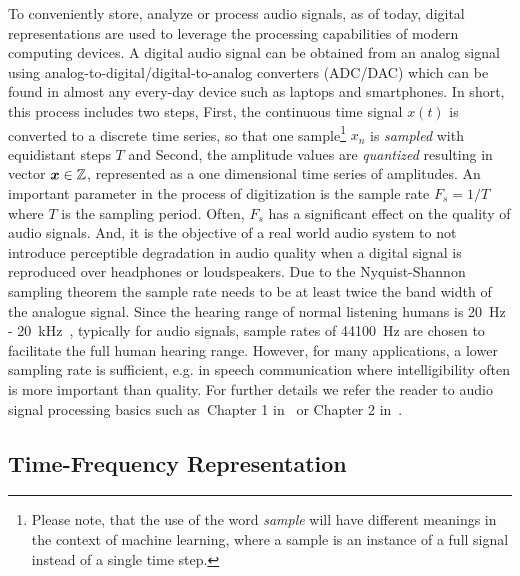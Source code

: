 To conveniently store, analyze or process audio signals, as of today, digital representations are used to leverage the processing capabilities of modern computing devices.
A digital audio signal can be obtained from an analog signal using analog-to-digital/digital-to-analog converters (ADC/DAC) which can be found in almost any every-day device such as laptops and smartphones.
In short, this process includes two steps, First, the continuous time signal \(x(t)\) is converted to a discrete time series, so that one sample\footnote{Please note, that the use of the word \emph{sample} will have different meanings in the context of machine learning, where a sample is an instance of a full signal instead of a single time step.} \(x_n\) is \emph{sampled} with equidistant steps \(T\) and Second, the amplitude values are \emph{quantized} resulting in vector \({\bm{x}} \in {\mathbb{Z}}\), represented as a one dimensional time series of amplitudes.
An important parameter in the process of digitization is the sample rate \(F_s = 1/T\) where \(T\) is the sampling period.
Often, \(F_s\) has a significant effect on the quality of audio signals.
And, it is the objective of a real world audio system to not introduce perceptible degradation in audio quality when a digital signal is reproduced over headphones or loudspeakers.
Due to the Nyquist-Shannon sampling theorem the sample rate needs to be at least twice the band width of the analogue signal.
Since the hearing range of normal listening humans is
20~\si{\hertz} - 20~\si{\kilo\hertz}~\cite{fastl90, moore89}, typically for audio signals, 
sample rates of 44100~\si{\hertz} are chosen to facilitate the full human hearing range.
However, for many applications, a lower sampling rate is sufficient, e.g. in speech communication where intelligibility often is more important than quality.
For further details we refer the reader to audio signal processing basics such as~Chapter 1 in~\cite{proakis96} or Chapter 2 in~\cite{Mueller15}.

\hypertarget{time-frequency-representation}{%
\subsection{Time-Frequency Representation}\label{sub:time-frequency-representation}}

